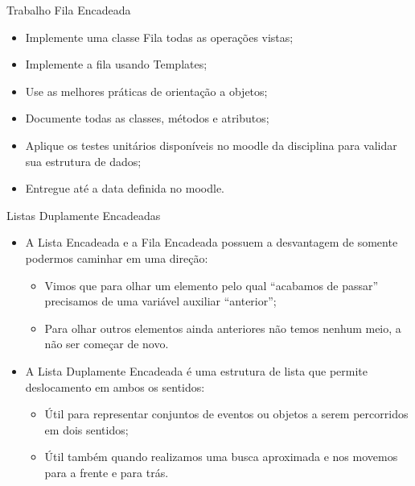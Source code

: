 \documentclass[12pt,table,xcolor={dvipsnames}]{beamer}
\begin{document}
\begin{frame}[fragile]{Trabalho Fila Encadeada}
\begin{itemize}
\item Implemente uma classe Fila todas as operações vistas;
\item Implemente a fila usando Templates;
\item Use as melhores práticas de orientação a objetos;
\item Documente todas as classes, métodos e atributos;
\item Aplique os testes unitários disponíveis no moodle da disciplina para validar sua estrutura de dados;
\item Entregue até a data definida no moodle.
\end{itemize}
\end{frame}

\begin{frame}[fragile]{Listas Duplamente Encadeadas}
\begin{itemize}
\item A Lista Encadeada e a Fila Encadeada possuem a desvantagem de somente podermos caminhar em uma direção:
\begin{itemize}
\item Vimos que para olhar um elemento pelo qual ``acabamos de passar'' precisamos de uma variável auxiliar ``anterior'';
\item Para olhar outros elementos ainda anteriores não temos nenhum meio, a não ser começar de novo.
\end{itemize}
\item A Lista Duplamente Encadeada é uma estrutura de lista que permite deslocamento em ambos os sentidos:
\begin{itemize}
\item Útil para representar conjuntos de eventos ou objetos a serem percorridos em dois sentidos;
\item Útil também quando realizamos uma busca aproximada e nos movemos para a frente e para trás.
\end{itemize}
\end{itemize}
\end{frame}
\end{document}
